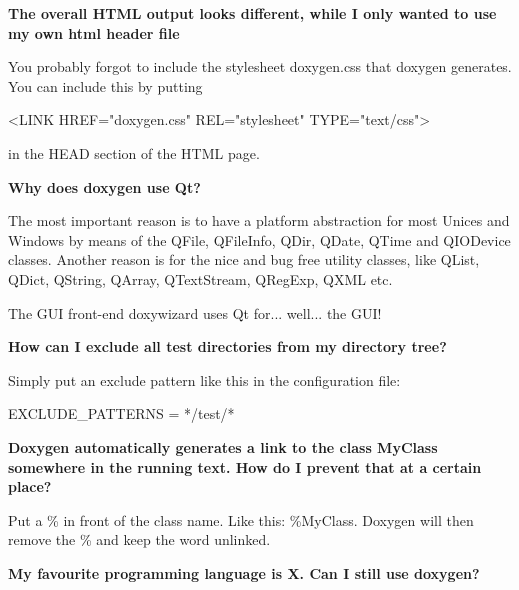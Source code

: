 \begin{DoxyEnumerate}
\item {\bfseries The overall HTML output looks different, while I only wanted to use my own html header file}

You probably forgot to include the stylesheet {\ttfamily doxygen.css} that doxygen generates. You can include this by putting \begin{DoxyVerb}
<LINK HREF="doxygen.css" REL="stylesheet" TYPE="text/css">
\end{DoxyVerb}
 in the HEAD section of the HTML page.


\item {\bfseries Why does doxygen use Qt?}

The most important reason is to have a platform abstraction for most Unices and Windows by means of the QFile, QFileInfo, QDir, QDate, QTime and QIODevice classes. Another reason is for the nice and bug free utility classes, like QList, QDict, QString, QArray, QTextStream, QRegExp, QXML etc.

The GUI front-\/end doxywizard uses Qt for... well... the GUI!


\item {\bfseries How can I exclude all test directories from my directory tree?}

Simply put an exclude pattern like this in the configuration file:

\begin{DoxyVerb}
EXCLUDE_PATTERNS = */test/*
\end{DoxyVerb}



\item {\bfseries Doxygen automatically generates a link to the class MyClass somewhere in the running text. How do I prevent that at a certain place?}

Put a \% in front of the class name. Like this: \%MyClass. Doxygen will then remove the \% and keep the word unlinked.


\item {\bfseries My favourite programming language is X. Can I still use doxygen?}


\end{DoxyEnumerate}
